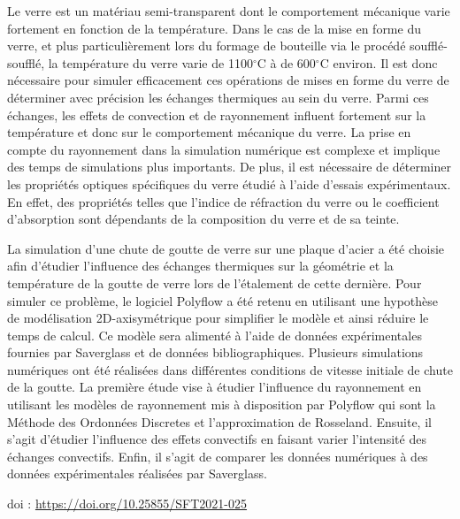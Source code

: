 {\normalsize
Le verre est un matériau semi-transparent dont le comportement mécanique varie fortement en fonction de la température. Dans le cas de la mise en forme du verre, et plus particulièrement lors du formage de bouteille via le procédé soufflé-soufflé, la température du verre varie de 1100$^{\circ}$C à de 600$^{\circ}$C environ. Il est donc nécessaire pour simuler efficacement ces opérations de mises en forme du verre de déterminer avec précision les échanges thermiques au sein du verre. Parmi ces échanges, les effets de convection et de rayonnement influent fortement sur la température et donc sur le comportement mécanique du verre. La prise en compte du rayonnement dans la simulation numérique est complexe et implique des temps de simulations plus importants. De plus, il est nécessaire de déterminer les propriétés optiques spécifiques du verre étudié à l'aide d'essais expérimentaux. En effet, des propriétés telles que l'indice de réfraction du verre ou le coefficient d'absorption sont dépendants de la composition du verre et de sa teinte. 



La simulation d'une chute de goutte de verre sur une plaque d'acier a été choisie afin d'étudier l'influence des échanges thermiques sur la géométrie et la température de la goutte de verre lors de l'étalement de cette dernière. Pour simuler ce problème, le logiciel Polyflow a été retenu en utilisant une hypothèse de modélisation 2D-axisymétrique pour simplifier le modèle et ainsi réduire le temps de calcul. Ce modèle sera alimenté à l'aide de données expérimentales fournies par Saverglass et de données bibliographiques. Plusieurs simulations numériques ont été réalisées dans différentes conditions de vitesse initiale de chute de la goutte. La première étude vise à étudier l'influence du rayonnement en utilisant les modèles de rayonnement mis à disposition par Polyflow qui sont la Méthode des Ordonnées Discretes et l'approximation de Rosseland. Ensuite, il s'agit d'étudier l'influence des effets convectifs en faisant varier l'intensité des échanges convectifs. Enfin, il s'agit de comparer les données numériques à des données expérimentales réalisées par Saverglass.

 \vfill doi : \url{https://doi.org/10.25855/SFT2021-025}

}
 
